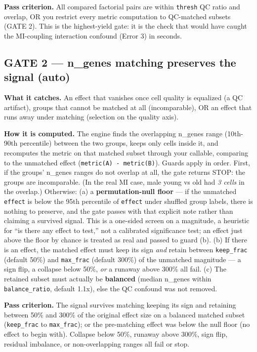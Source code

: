 \documentclass[
  11pt,
]{article}
\begin{document}
\textbf{Pass criterion.} All compared factorial pairs are within
\texttt{thresh} QC ratio and overlap, OR you restrict every metric
computation to QC-matched subsets (GATE 2). This is the highest-yield
gate: it is the check that would have caught the MI-coupling interaction
confound (Error 3) in seconds.

\subsection{GATE 2 --- n\_genes matching preserves the signal
(auto)}\label{gate-2-n_genes-matching-preserves-the-signal-auto}

\textbf{What it catches.} An effect that vanishes once cell quality is
equalized (a QC artifact), groups that cannot be matched at all
(incomparable), OR an effect that runs away under matching (selection on
the quality axis).

\textbf{How it is computed.} The engine finds the overlapping n\_genes
range (10th-90th percentile) between the two groups, keeps only cells
inside it, and recomputes the metric on that matched subset through your
callable, comparing to the unmatched effect
(\texttt{metric(A)\ -\ metric(B)}). Guards apply in order. First, if the
groups' n\_genes ranges do not overlap at all, the gate returns STOP:
the groups are incomparable. (In the real MI case, male young vs old had
\emph{3 cells} in the overlap.) Otherwise: (a) a
\textbf{permutation-null floor} --- if the unmatched
\texttt{\textbar{}effect\textbar{}} is below the 95th percentile of
\texttt{\textbar{}effect\textbar{}} under shuffled group labels, there
is nothing to preserve, and the gate passes with that explicit note
rather than claiming a survived signal. This is a one-sided screen on a
magnitude, a heuristic for ``is there any effect to test,'' not a
calibrated significance test; an effect just above the floor by chance
is treated as real and passed to guard (b). (b) If there is an effect,
the matched effect must keep its sign \emph{and} retain between
\texttt{keep\_frac} (default 50\%) and \texttt{max\_frac} (default
300\%) of the unmatched magnitude --- a sign flip, a collapse below
50\%, \emph{or} a runaway above 300\% all fail. (c) The retained subset
must actually be \textbf{balanced} (median n\_genes within
\texttt{balance\_ratio}, default 1.1x), else the QC confound was not
removed.

\textbf{Pass criterion.} The signal survives matching keeping its sign
and retaining between 50\% and 300\% of the original effect size on a
balanced matched subset (\texttt{keep\_frac} to \texttt{max\_frac}); or
the pre-matching effect was below the null floor (no effect to begin
with). Collapse below 50\%, runaway above 300\%, sign flip, residual
imbalance, or non-overlapping ranges all fail or stop.
\end{document}
